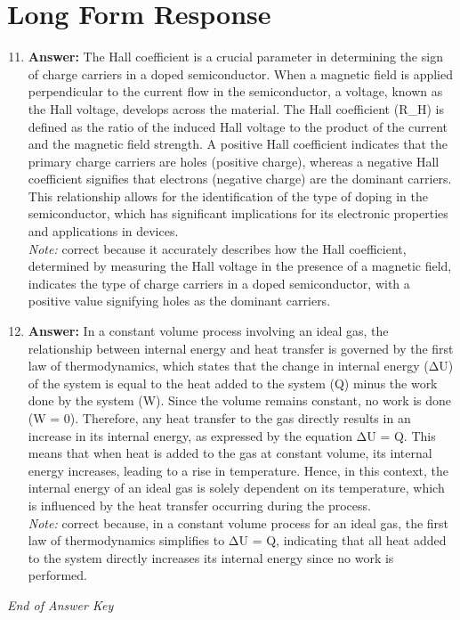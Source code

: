 \documentclass[12pt]{article}
\begin{document}
\section*{Long Form Response}
\begin{enumerate}[label=\arabic*.]
\setcounter{enumi}{10}
\item \textbf{Answer:} The Hall coefficient is a crucial parameter in determining the sign of charge carriers in a doped semiconductor. When a magnetic field is applied perpendicular to the current flow in the semiconductor, a voltage, known as the Hall voltage, develops across the material. The Hall coefficient (R\_H) is defined as the ratio of the induced Hall voltage to the product of the current and the magnetic field strength. A positive Hall coefficient indicates that the primary charge carriers are holes (positive charge), whereas a negative Hall coefficient signifies that electrons (negative charge) are the dominant carriers. This relationship allows for the identification of the type of doping in the semiconductor, which has significant implications for its electronic properties and applications in devices.
\\ \textit{Note:} correct because it accurately describes how the Hall coefficient, determined by measuring the Hall voltage in the presence of a magnetic field, indicates the type of charge carriers in a doped semiconductor, with a positive value signifying holes as the dominant carriers.
\item \textbf{Answer:} In a constant volume process involving an ideal gas, the relationship between internal energy and heat transfer is governed by the first law of thermodynamics, which states that the change in internal energy (ΔU) of the system is equal to the heat added to the system (Q) minus the work done by the system (W). Since the volume remains constant, no work is done (W = 0). Therefore, any heat transfer to the gas directly results in an increase in its internal energy, as expressed by the equation ΔU = Q. This means that when heat is added to the gas at constant volume, its internal energy increases, leading to a rise in temperature. Hence, in this context, the internal energy of an ideal gas is solely dependent on its temperature, which is influenced by the heat transfer occurring during the process.
\\ \textit{Note:} correct because, in a constant volume process for an ideal gas, the first law of thermodynamics simplifies to ΔU = Q, indicating that all heat added to the system directly increases its internal energy since no work is performed.
\end{enumerate}

\vfill
\noindent\textit{End of Answer Key}
\end{document}
